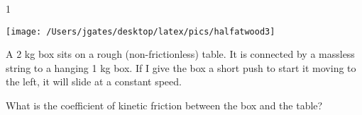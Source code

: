 
\AddToShipoutPicture*{\BackgroundPic}

\addtocounter {ProbNum} {1}

\begin{floatingfigure}[r]{.2\textwidth}
\texttt{[image: /Users/jgates/desktop/latex/pics/halfatwood3]}
\end{floatingfigure}
 
{\bf \Large{}} A 2 kg box sits on a rough (non-frictionless) table. It is connected by a massless string to a hanging 1 kg box.  If I give the box a short push to start it moving to the left, it will slide at a constant speed.
 
\bigskip
What is the coefficient of kinetic friction between the box and the table?\paragraph{}
\noindent
\vfill

\newpage
